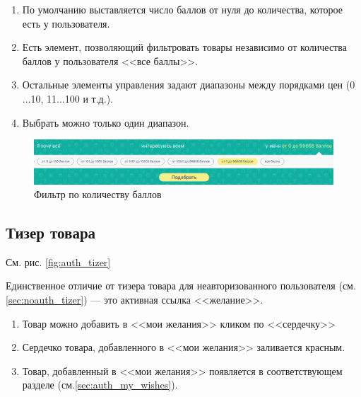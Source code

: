             \begin{enumerate}
                \item По умолчанию выставляется число баллов от нуля до 
                количества, которое есть у пользователя.
                \item Есть элемент, позволяющий фильтровать товары 
                независимо от количества баллов у пользователя <<все баллы>>.
                \item Остальные элементы управления задают диапазоны между 
                порядками цен (0$\dots$10, 11$\dots$100 и т.д.).
                \item Выбрать можно только один диапазон.
            \end{enumerate}

            
            \begin{figure}
                \center
                \includegraphics[width=170mm]{04_auth_funcs/figures/02.eps}
                \caption{Фильтр по количеству баллов}
                \label{fig:auth_filter}
            \end{figure}
        
        \subsection{Тизер товара}

            См. рис. \ref{fig:auth_tizer}
        
            Единственное отличие от тизера товара для неавторизованного 
            пользователя (см. \ref{sec:noauth_tizer})
            --- это активная ссылка <<желание>>.
            \begin{enumerate}
                \item Товар можно добавить в <<мои желания>> кликом по 
                <<сердечку>>
                \item Сердечко товара, добавленного в <<мои желания>> 
                заливается красным.
                \item Товар, добавленный в <<мои желания>> появляется в 
                соответствующем разделе (см.\ref{sec:auth_my_wishes}).
            \end{enumerate}

